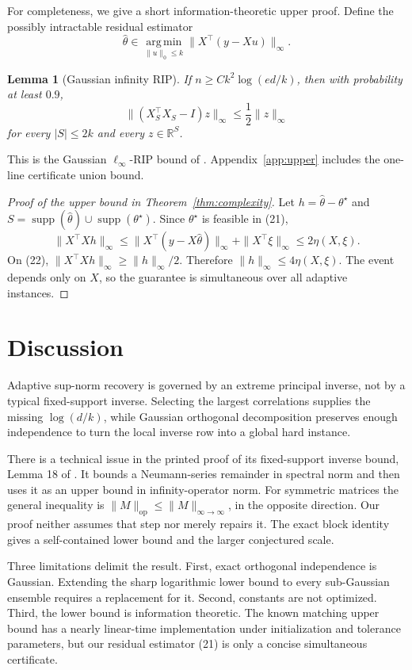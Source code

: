 \documentclass[twoside]{article}
\newtheorem{lemma}[theorem]{Lemma}
\newcommand{\R}{\mathbb R}
\newcommand{\supp}{\operatorname{supp}}
\newcommand{\argmin}{\operatorname*{arg\,min}}
\begin{document}
For completeness, we give a short information-theoretic upper proof. Define the
possibly intractable residual estimator
\[
 \widehat\theta\in
 \argmin_{\|u\|_0\leq k}\|X^\top(y-Xu)\|_\infty.
 \tag{21}
\]

\begin{lemma}[Gaussian infinity RIP]
\label{lem:infrip}
If $n\geq Ck^2\log(ed/k)$, then with probability at least $0.9$,
\[
 \|(X_S^\top X_S-I)z\|_\infty\leq\frac12\|z\|_\infty
 \tag{22}
\]
for every $|S|\leq2k$ and every $z\in\R^S$.
\end{lemma}

This is the Gaussian $\ell_\infty$-RIP bound of
\citet{chen2026adaptive}. Appendix~\ref{app:upper} includes the one-line
certificate union bound.

\begin{proof}[Proof of the upper bound in Theorem~\ref{thm:complexity}]
Let $h=\widehat\theta-\theta^\star$ and
$S=\supp(\widehat\theta)\cup\supp(\theta^\star)$. Since $\theta^\star$ is
feasible in (21),
\[
 \|X^\top Xh\|_\infty
 \leq\|X^\top(y-X\widehat\theta)\|_\infty
     +\|X^\top\xi\|_\infty
 \leq2\eta(X,\xi).
\]
On (22),
$\|X^\top Xh\|_\infty\geq\|h\|_\infty/2$. Therefore
$\|h\|_\infty\leq4\eta(X,\xi)$. The event depends only on $X$, so the
guarantee is simultaneous over all adaptive instances.
\end{proof}

\section{Discussion}
\label{sec:discussion}

Adaptive sup-norm recovery is governed by an extreme principal inverse, not by
a typical fixed-support inverse. Selecting the largest correlations supplies the
missing $\log(d/k)$, while Gaussian orthogonal decomposition preserves enough
independence to turn the local inverse row into a global hard instance.

There is a technical issue in the printed proof of its fixed-support inverse
bound, Lemma 18 of \citet{chen2026adaptive}. It bounds a Neumann-series
remainder in spectral norm
and then uses it as an upper bound in infinity-operator norm. For symmetric
matrices the general inequality is
$\|M\|_{\mathrm{op}}\leq\|M\|_{\infty\to\infty}$, in the opposite direction.
Our proof neither assumes that step nor merely repairs it. The exact block
identity gives a self-contained lower bound and the larger conjectured scale.

Three limitations delimit the result. First, exact orthogonal independence is
Gaussian. Extending the sharp logarithmic lower bound to every sub-Gaussian
ensemble requires a replacement for it. Second, constants are not optimized.
Third, the lower bound is information theoretic. The known matching upper bound
has a nearly linear-time implementation under initialization and tolerance
parameters, but our residual estimator (21) is only a concise simultaneous
certificate.
\end{document}
